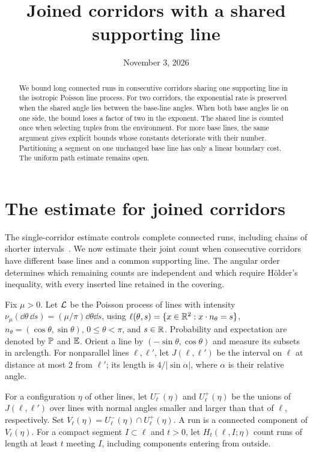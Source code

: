 \documentclass[11pt,letterpaper]{article}
\title{Joined corridors with a shared supporting line}
\author{}
\date{November 3, 2026}
\begin{document}
\maketitle
\begin{abstract}
We bound long connected runs in consecutive corridors sharing one supporting line in the isotropic Poisson line process. For two corridors, the exponential rate is preserved when the shared angle lies between the base-line angles. When both base angles lie on one side, the bound loses a factor of two in the exponent. The shared line is counted once when selecting tuples from the environment. For more base lines, the same argument gives explicit bounds whose constants deteriorate with their number. Partitioning a segment on one unchanged base line has only a linear boundary cost. The uniform path estimate remains open.
\end{abstract}

\section{The estimate for joined corridors}

The single-corridor estimate controls complete connected runs, including chains of shorter intervals~\cite{CR26}. We now estimate their joint count when consecutive corridors have different base lines and a common supporting line. The angular order determines which remaining counts are independent and which require H\"older's inequality, with every inserted line retained in the covering.

Fix $\mu>0$. Let $\cL$ be the Poisson process of lines with intensity $\nu_\mu(\dd\theta\,\dd s)=(\mu/\pi)\dd\theta\dd s$, using $\ell(\theta,s)=\{x\in\R^2:x\cdot n_\theta=s\}$, $n_\theta=(\cos\theta,\sin\theta)$, $0\le\theta<\pi$, and $s\in\R$. Probability and expectation are denoted by $\P$ and $\E$. Orient a line by $(-\sin\theta,\cos\theta)$ and measure its subsets in arclength. For nonparallel lines $\ell,\ell'$, let $J(\ell,\ell')$ be the interval on $\ell$ at distance at most $2$ from $\ell'$; its length is $4/|\sin\alpha|$, where $\alpha$ is their relative angle.

For a configuration $\eta$ of other lines, let $U_\ell^-(\eta)$ and $U_\ell^+(\eta)$ be the unions of $J(\ell,\ell')$ over lines with normal angles smaller and larger than that of $\ell$, respectively. Set $V_\ell(\eta)=U_\ell^-(\eta)\cap U_\ell^+(\eta)$. A run is a connected component of $V_\ell(\eta)$. For a compact segment $I\subset\ell$ and $t>0$, let $H_t(\ell,I;\eta)$ count runs of length at least $t$ meeting $I$, including components entering from outside.
\end{document}
